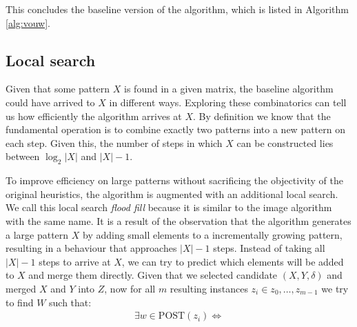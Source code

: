 \documentclass{llncs}
\begin{document}
This concludes the baseline version of the algorithm, which is listed in Algorithm \ref{alg:vouw}. 

\subsection{Local search}

Given that some pattern $X$ is found in a given matrix, the baseline algorithm could have arrived to $X$ in different ways. Exploring these combinatorics can tell us how efficiently the algorithm arrives at $X$. By definition we know that the fundamental operation is to combine exactly two patterns into a new pattern on each step. Given this, the number of steps in which $X$ can be constructed lies between $\log_2|X|$ and $|X|-1$. 


To improve efficiency on large patterns without sacrificing the objectivity of the original heuristics, the algorithm is augmented with an additional local search. We call this local search \emph{flood fill} because it is similar to the image algorithm with the same name. It is a result of the observation that the algorithm generates a large pattern $X$ by adding small elements to a incrementally growing pattern, resulting in a behaviour that approaches $|X|-1$ steps. Instead of taking all $|X|-1$ steps to arrive at $X$, we can try to predict which elements will be added to $X$ and merge them directly. Given that we selected candidate $(X,Y,\delta)$ and merged $X$ and $Y$ into $Z$, now for all $m$ resulting instances $z_i \in {z_0,\dots,z_{m-1}}$ we try to find $W$ such that:
\begin{align}
\exists w \in \mathrm{POST}(z_i) \iff 
\end{align}



\end{document}
